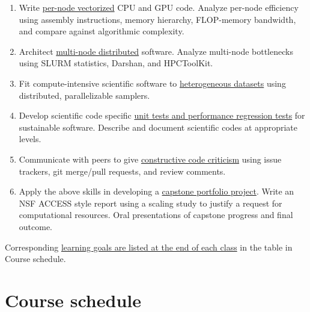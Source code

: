 \documentclass[12pt]{article}
\begin{document}
\begin{enumerate}
\item Write \ul{per-node vectorized} CPU and GPU code.
  Analyze per-node efficiency using assembly instructions, %
  memory hierarchy, FLOP-memory bandwidth, and %
  compare against algorithmic complexity.
\item Architect \ul{multi-node distributed} software.
  Analyze multi-node bottlenecks using SLURM statistics, %
  Darshan, and HPCToolKit.
\item Fit compute-intensive scientific software %
  to \ul{heterogeneous datasets} %
  using distributed, parallelizable samplers.
\item Develop scientific code specific %
  \ul{unit tests and performance regression tests} %
  for sustainable software.
  Describe and document scientific codes at appropriate levels.
\item Communicate with peers to give \ul{constructive code criticism} %
  using issue trackers, git merge/pull requests, and review comments.
\item Apply the above skills in developing a \ul{capstone portfolio project}.
  Write an NSF ACCESS style report %
  using a scaling study to justify a request for computational resources.
  Oral presentations of capstone progress and final outcome.
\end{enumerate}

\noindent
Corresponding \ul{learning goals %
are listed at the end of each class} %
in the table in  Course schedule.

\section{Course schedule}%
\label{sec:course-schedule}
\end{document}
